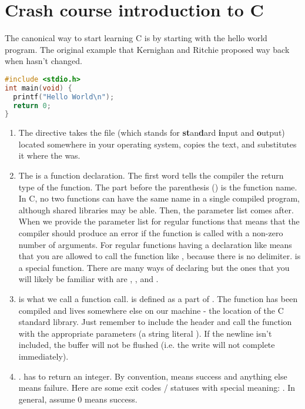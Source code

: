 \section{Crash course introduction to C}

The canonical way to start learning C is by starting with the \gls{hello world} program.
The original example that Kernighan and Ritchie proposed way back when hasn't changed.

\begin{lstlisting}[language=C]
#include <stdio.h>
int main(void) {
  printf("Hello World\n");
  return 0;
}
\end{lstlisting}

\begin{enumerate}
	\item The  directive takes the file  (which stands for \textbf{st}an\textbf{d}ard \textbf{i}nput and \textbf{o}utput) located somewhere in your operating system, copies the text, and substitutes it where the  was.
	\item The  is a function declaration.
    The first word  tells the compiler the return type of the function.
    The part before the parenthesis () is the function name.
    In C, no two functions can have the same name in a single compiled program, although shared libraries may be able.
    Then, the parameter list comes after.
    When we provide the parameter list for regular functions  that means that the compiler should produce an error if the function is called with a non-zero number of arguments.
    For regular functions having a declaration like  means that you are allowed to call the function like , because there is no delimiter.
     is a special function.
    There are many ways of declaring  but the ones that you will likely be familiar with are , , and .
	\item {} is what we call a function call.
     is defined as a part of .
    The function has been compiled and lives somewhere else on our machine - the location of the C standard library.
    Just remember to include the header and call the function with the appropriate parameters (a string literal ).
    If the newline isn't included, the buffer will not be flushed (i.e. the write will not complete immediately).
	\item {}.
     has to return an integer.
    By convention,  means success and anything else means failure.
    Here are some exit codes / statuses with special meaning: .
    In general, assume 0 means success.
\end{enumerate}

